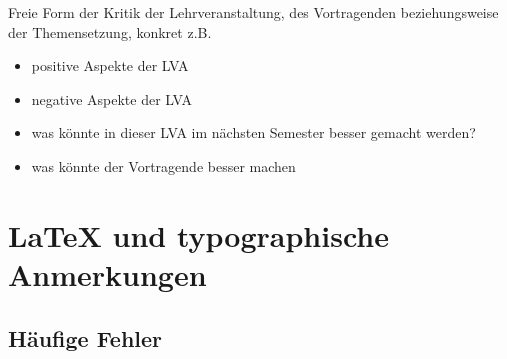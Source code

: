 \documentclass[twoside, a4paper, DIV=11, open=any, bibliography=totoc]{scrbook}
\begin{document}
Freie Form der Kritik der Lehrveranstaltung, des Vortragenden beziehungsweise der Themensetzung, konkret z.B.

\begin{itemize}
    \item positive Aspekte der LVA
    \item negative Aspekte der LVA
    \item was könnte in dieser LVA im nächsten Semester besser gemacht werden?
    \item was könnte der Vortragende besser machen
\end{itemize}


\appendix
\chapter{\LaTeX{} und typographische Anmerkungen} \label{chap:latexRes}

\section{Häufige Fehler} \label{sec:fehler}
\end{document}
